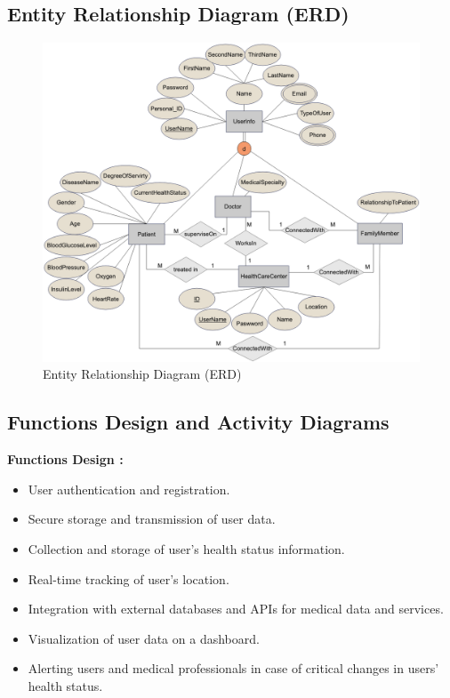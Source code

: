 \documentclass[12pt]{article}
\begin{document}
		\newpage
		
			\subsection{Entity Relationship Diagram (ERD)}
				\begin{figure}[!h]
				\centering
				\includegraphics[width=\textwidth]{ERD.png}
				\caption{Entity Relationship Diagram (ERD)}
				\label{Entity Relationship Diagram (ERD)}
			\end{figure}
		
		\newpage
		
			\subsection{Functions Design and Activity Diagrams}
			\textbf{Functions Design :}
			\begin{itemize}
				\item User authentication and registration.
				\item Secure storage and transmission of user data.
				\item Collection and storage of user's health status information.
				\item Real-time tracking of user's location.
				\item Integration with external databases and APIs for medical data and services.
				\item Visualization of user data on a dashboard.
				\item Alerting users and medical professionals in case of critical changes in users’ health status.
				
			\end{itemize}
		
\end{document}
